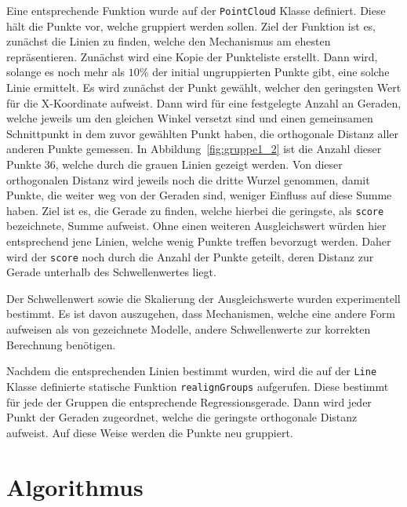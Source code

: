 Eine entsprechende Funktion wurde auf der \lstinline{PointCloud} Klasse definiert.
Diese hält die Punkte vor, welche gruppiert werden sollen.
Ziel der Funktion ist es, zunächst die Linien zu finden, welche den Mechanismus am ehesten repräsentieren.
Zunächst wird eine Kopie der Punkteliste erstellt.
Dann wird, solange es noch mehr als $10\%$ der initial ungruppierten Punkte gibt, eine solche Linie ermittelt.
Es wird zunächst der Punkt gewählt, welcher den geringsten Wert für die X-Koordinate aufweist.
Dann wird für eine festgelegte Anzahl an Geraden, welche jeweils um den gleichen Winkel versetzt sind und einen gemeinsamen Schnittpunkt in dem zuvor gewählten Punkt haben, die orthogonale Distanz aller anderen Punkte gemessen.
In Abbildung~\ref{fig:gruppe1_2} ist die Anzahl dieser Punkte 36, welche durch die grauen Linien gezeigt werden.
Von dieser orthogonalen Distanz wird jeweils noch die dritte Wurzel genommen, damit Punkte, die weiter weg von der Geraden sind, weniger Einfluss auf diese Summe haben.
Ziel ist es, die Gerade zu finden, welche hierbei die geringste, als \lstinline{score} bezeichnete, Summe aufweist.
Ohne einen weiteren Ausgleichswert würden hier entsprechend jene Linien, welche wenig Punkte treffen bevorzugt werden.
Daher wird der \lstinline{score} noch durch die Anzahl der Punkte geteilt, deren Distanz zur Gerade unterhalb des Schwellenwertes liegt.

Der Schwellenwert sowie die Skalierung der Ausgleichswerte wurden experimentell bestimmt.
Es ist davon auszugehen, dass Mechanismen, welche eine andere Form aufweisen als von  gezeichnete Modelle, andere Schwellenwerte zur korrekten Berechnung benötigen.

Nachdem die entsprechenden Linien bestimmt wurden, wird die auf der \lstinline{Line} Klasse definierte statische Funktion \lstinline{realignGroups} aufgerufen.
Diese bestimmt für jede der Gruppen die entsprechende Regressionsgerade.
Dann wird jeder Punkt der Geraden zugeordnet, welche die geringste orthogonale Distanz aufweist.
Auf diese Weise werden die Punkte neu gruppiert.

\section{ Algorithmus}\label{ch:kMeans}

